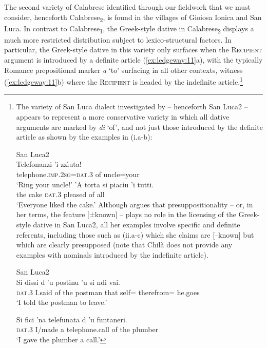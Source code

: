 \documentclass[output=paper,modfonts,nonflat]{langsci/langscibook}
\begin{document}
The second variety of Calabrese identified through our fieldwork that we must consider, henceforth Calabrese\textsubscript{2}, is found in the villages of Gioiosa Ionica and San Luca. In contrast to Calabrese\textsubscript{1}, the Greek-style dative in Calabrese\textsubscript{2} displays a much more restricted distribution subject to lexico-structural factors. In particular, the Greek-style dative in this variety only surfaces when the \textsc{Recipient} argument is introduced by a definite article (\ref{ex:ledgeway:11}a), with the typically Romance prepositional marker \textit{a} ‘to’ surfacing in all other contexts, witness (\ref{ex:ledgeway:11}b) where the \textsc{Recipient} is headed by the indefinite article.\footnote{The
    variety of San Luca dialect investigated by \citet{Chila2017} – henceforth San Luca2 – appears to represent a more conservative variety in which all dative arguments are marked by \textit{di} ‘of’, and not just those introduced by the definite article as shown by the examples in (i.a-b):
    
    \ea
    San Luca2 \\
    \ea
    \gll Telefonanzi  ’i  zzìuta!   \\
        telephone.\textsc{imp.2sg=dat.3}  of  uncle=your  \\
        \glt `Ring your uncle!' 
    \ex  ’A  torta  si  piacìu  ’i  tutti.\\
        the  cake  \textsc{dat}.3  pleased  of  all  \\
        \glt `Everyone liked the cake.'
        \z
        \z        
        Although \citet[4-5]{Chila2017} argues that presuppositionality – or, in her terms, the feature [±known] – plays no role in the licensing of the Greek-style dative in San Luca2, all her examples involve specific and definite referents, including those such as (ii.a-c) which she claims are [–known] but which are clearly presupposed (note that Chilà does not provide any examples with nominals introduced by the indefinite article).  
    
    \ea
    San Luca2 \\
    \ea 
    \gll Si  dissi  d  ’u  postinu  ’u  si  ndi  vai.\\
    \textsc{dat}.3  I.said  of  the  postman  that  self=  therefrom=  he.goes\\
    \glt `I told the postman to leave.'  
    
    \ex
    \gll Si  fici  ’na  telefunata  d  ’u  funtaneri.\\
    \textsc{dat}.3  I/made  a  telephone.call  of  the  plumber \\
    \glt `I gave the plumber a call.' 
    
}
\end{document}
